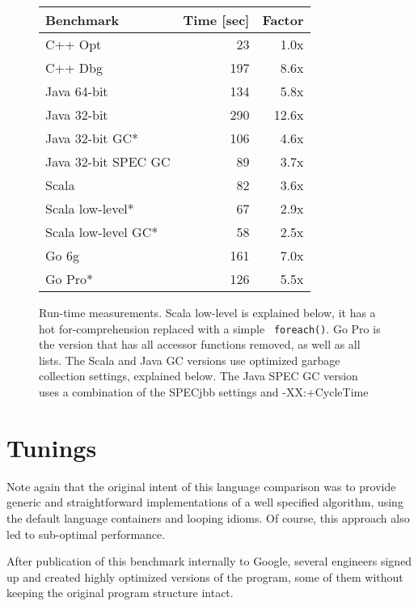 \begin{figure}
\begin{tabular}{|l|r|r|} \hline
 Benchmark   & Time [sec] &	 Factor  \\ \hline\hline
 C++ Opt	& 23 	  & 1.0x \\ \hline
 C++ Dbg	&197 	  & 8.6x \\ \hline
 Java 64-bit	& 134 	  & 5.8x \\ \hline
 Java 32-bit	& 290	  &12.6x \\ \hline
 Java 32-bit GC* & 106	  &4.6x \\ \hline
 Java 32-bit SPEC GC & 89 &	 3.7x \\ \hline
 Scala 	             & 82 &	 3.6x \\ \hline
 Scala low-level*    & 67 &	 2.9x \\ \hline
 Scala low-level GC* & 58 &	 2.5x \\ \hline
 Go 6g	             & 161 & 	 7.0x \\ \hline
 Go Pro*	     & 126 &	 5.5x \\ \hline
\end{tabular}

\caption{Run-time measurements. Scala low-level is explained below, it
  has a hot for-comprehension replaced with a simple {\tt
    foreach()}. Go Pro is the version that has all accessor functions
  removed, as well as all lists. The Scala and Java GC versions use
  optimized garbage collection settings, explained below. The Java
  SPEC GC version uses a combination of the SPECjbb settings and
  -XX:+CycleTime }

\label{runtime}
\end{figure}




\section{Tunings}
\label{tuning}

Note again that the original intent of this language comparison was to
provide generic and straightforward implementations of a well
specified algorithm, using the default language containers and looping
idioms. Of course, this approach
also led to sub-optimal performance. 

After publication of this benchmark internally to Google, several
engineers signed up and created highly optimized versions of the program,
some of them without keeping the original program structure intact. 

